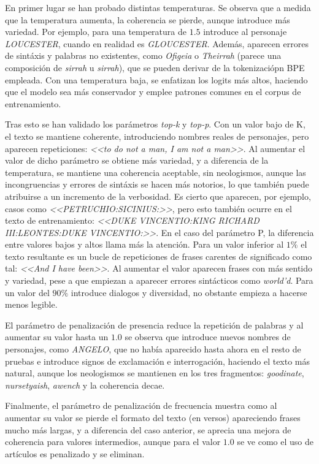 \documentclass[11pt]{book}
\theoremstyle{plain}
\theoremstyle{definition}
\begin{document}
En primer lugar se han probado distintas temperaturas. Se observa que a medida que la temperatura aumenta, la coherencia se pierde, aunque introduce más variedad. Por ejemplo, para una temperatura de $1.5$ introduce al personaje \textit{LOUCESTER}, cuando en realidad es \textit{GLOUCESTER}. Además, aparecen errores de sintáxis y palabras no existentes, como \textit{Ofigeia} o \textit{Theirrah} (parece una composición de \textit{sirrah} u \textit{sirrah}), que se pueden derivar de la tokenizaciópn BPE empleada. Con una temperatura baja, se enfatizan los logits más altos, haciendo que el modelo sea más conservador y emplee patrones comunes en el corpus de entrenamiento. 

Tras esto se han validado los parámetros \textit{top-k} y \textit{top-p}. Con un valor bajo de K, el texto se mantiene coherente, introduciendo nombres reales de personajes, pero aparecen repeticiones: \textit{<<to do not a man, I am not a man>>}. Al aumentar el valor de dicho parámetro se obtiene más variedad, y a diferencia de la temperatura, se mantiene una coherencia aceptable, sin neologismos, aunque las incongruencias y errores de sintáxis se hacen más notorios, lo que también puede atribuirse a un incremento de la verbosidad. Es cierto que aparecen, por ejemplo, casos como \textit{<<PETRUCHIO:SICINIUS:>>}, pero esto también ocurre en el texto de entrenamiento: \textit{<<DUKE VINCENTIO:KING RICHARD III:LEONTES:DUKE VINCENTIO:>>}. En el caso del parámetro P, la diferencia entre valores bajos y altos llama más la atención. Para un valor inferior al $1\%$ el texto resultante es un bucle de repeticiones de frases carentes de significado como tal: \textit{<<And I have been>>}. Al aumentar el valor aparecen frases con más sentido y variedad, pese a que empiezan a aparecer errores sintácticos como \textit{world’d}. Para un valor del $90\%$ introduce dialogos y diversidad, no obstante empieza a hacerse menos legible.

El parámetro de penalización de presencia reduce la repetición de palabras y al aumentar su valor hasta un $1.0$ se observa que introduce nuevos nombres de personajes, como \textit{ANGELO}, que no había aparecido hasta ahora en el resto de pruebas e introduce signos de exclamación e interrogación, haciendo el texto más natural, aunque los neologismos se mantienen en los tres fragmentos: \textit{goodinate}, \textit{nursetyaish}, \textit{awench} y la coherencia decae.

Finalmente, el parámetro de penalización de frecuencia muestra como al aumentar su valor se pierde el formato del texto (en versos) apareciendo frases mucho más largas, y a diferencia del caso anterior, se aprecia una mejora de coherencia para valores intermedios, aunque para el valor $1.0$ se ve como el uso de artículos es penalizado y se eliminan. 
\end{document}
